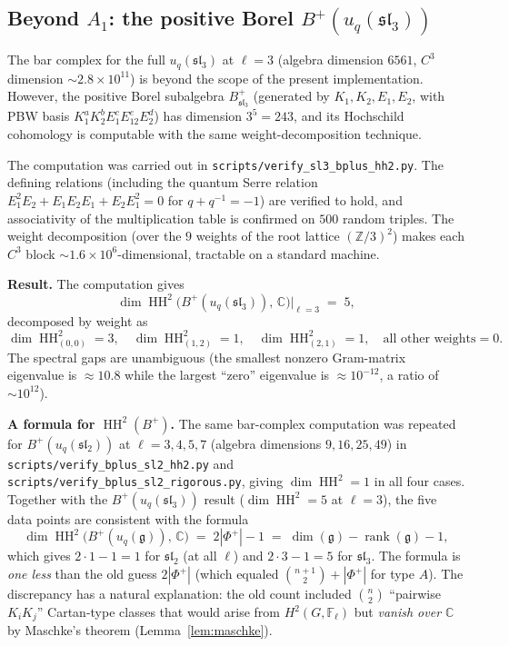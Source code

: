 \documentclass[11pt,letterpaper]{amsart}
\theoremstyle{plain}
\theoremstyle{definition}
\theoremstyle{remark}
\newcommand{\HH}{\operatorname{HH}}
\newcommand{\CC}{\mathbb{C}}
\newcommand{\ZZ}{\mathbb{Z}}
\newcommand{\FF}{\mathbb{F}}
\begin{document}
\subsection{Beyond $A_1$: the positive Borel $B^+(u_q(\mathfrak{sl}_3))$}
\label{sec:sl3_bplus}

The bar complex for the full $u_q(\mathfrak{sl}_3)$ at $\ell = 3$ (algebra dimension $6561$, $C^3$ dimension $\sim 2.8 \times 10^{11}$) is beyond the scope of the present implementation. However, the positive Borel subalgebra $B^+_{\mathfrak{sl}_3}$ (generated by $K_1, K_2, E_1, E_2$, with PBW basis $K_1^a K_2^b E_1^c E_{12}^e E_2^d$) has dimension $3^5 = 243$, and its Hochschild cohomology is computable with the same weight-decomposition technique.

The computation was carried out in \texttt{scripts/verify\_sl3\_bplus\_hh2.py}. The defining relations (including the quantum Serre relation $E_1^2 E_2 + E_1 E_2 E_1 + E_2 E_1^2 = 0$ for $q + q^{-1} = -1$) are verified to hold, and associativity of the multiplication table is confirmed on $500$ random triples. The weight decomposition (over the $9$ weights of the root lattice $(\ZZ/3)^2$) makes each $C^3$ block $\sim 1.6 \times 10^6$-dimensional, tractable on a standard machine.

\textbf{Result.} The computation gives
\[
\dim \HH^2\bigl(B^+(u_q(\mathfrak{sl}_3)),\, \CC\bigr)\Big|_{\ell=3} \;=\; 5,
\]
decomposed by weight as
\[
\dim \HH^2_{(0,0)} = 3, \quad \dim \HH^2_{(1,2)} = 1, \quad \dim \HH^2_{(2,1)} = 1, \quad \text{all other weights} = 0.
\]
The spectral gaps are unambiguous (the smallest nonzero Gram-matrix eigenvalue is $\approx 10.8$ while the largest ``zero'' eigenvalue is $\approx 10^{-12}$, a ratio of $\sim 10^{12}$).

\textbf{A formula for $\HH^2(B^+)$.} The same bar-complex computation was repeated for $B^+(u_q(\mathfrak{sl}_2))$ at $\ell = 3, 4, 5, 7$ (algebra dimensions $9, 16, 25, 49$) in \texttt{scripts/verify\_bplus\_sl2\_hh2.py} and \texttt{scripts/verify\_bplus\_sl2\_rigorous.py}, giving $\dim \HH^2 = 1$ in all four cases. Together with the $B^+(u_q(\mathfrak{sl}_3))$ result ($\dim \HH^2 = 5$ at $\ell = 3$), the five data points are consistent with the formula
\[
\dim \HH^2\bigl(B^+(u_q(\mathfrak{g})),\, \CC\bigr) \;=\; 2|\Phi^+| - 1 \;=\; \dim(\mathfrak{g}) - \operatorname{rank}(\mathfrak{g}) - 1,
\]
which gives $2 \cdot 1 - 1 = 1$ for $\mathfrak{sl}_2$ (at all $\ell$) and $2 \cdot 3 - 1 = 5$ for $\mathfrak{sl}_3$. The formula is \emph{one less} than the old guess $2|\Phi^+|$ (which equaled $\binom{n+1}{2} + |\Phi^+|$ for type $A$). The discrepancy has a natural explanation: the old count included $\binom{n}{2}$ ``pairwise $K_i K_j$'' Cartan-type classes that would arise from $H^2(G, \FF_\ell)$ but \emph{vanish over $\CC$} by Maschke's theorem (Lemma~\ref{lem:maschke}).
\end{document}
